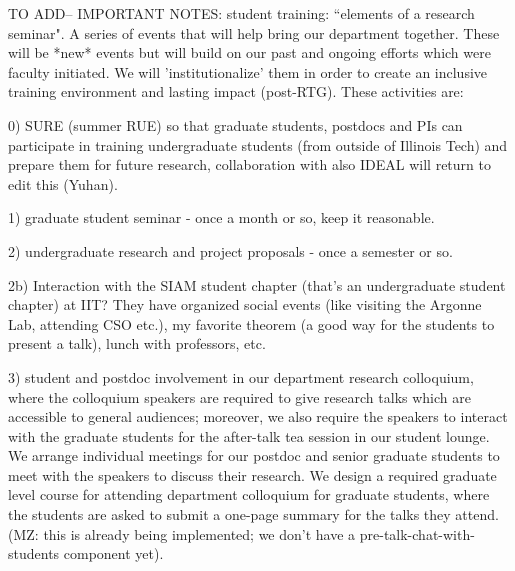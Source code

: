 \documentclass[11pt]{NSFamsart}
\begin{document}
{\color{cyan}TO ADD-- IMPORTANT NOTES}: student training: ``elements of a research seminar". A series of events that will help bring our department together. These will be *new* events but will build on our past and ongoing efforts which were faculty initiated. We will 'institutionalize' them in order to create an inclusive training environment and lasting impact (post-RTG). These activities are: 

0) SURE (summer RUE) so that graduate students, postdocs and PIs can participate in training undergraduate students (from outside of Illinois Tech) and prepare them for future research, collaboration with also IDEAL {\color{magenta}will return to edit this (Yuhan).}

1) graduate student seminar  - once a month or so, keep it reasonable. 

2) undergraduate research and project proposals   - once a semester or so. 

2b) Interaction with the SIAM student chapter (that's an undergraduate student chapter) at IIT?  They have organized social events (like visiting the Argonne Lab, attending CSO etc.), my favorite theorem (a good way for the students to present a talk), lunch with professors, etc.

3) student and postdoc involvement in our department research colloquium, where the colloquium speakers are required to give research talks which are accessible to general audiences; moreover, we also require the speakers to interact with the graduate students for the after-talk tea session in our student lounge.  We arrange individual meetings for our postdoc and senior graduate students to meet with the speakers to discuss their research.  We design a required graduate level course for attending department colloquium for graduate students, where the students are asked to submit a one-page summary for the talks they attend.  (MZ: this is already being implemented; we don't have a pre-talk-chat-with-students component yet).

\end{document}
